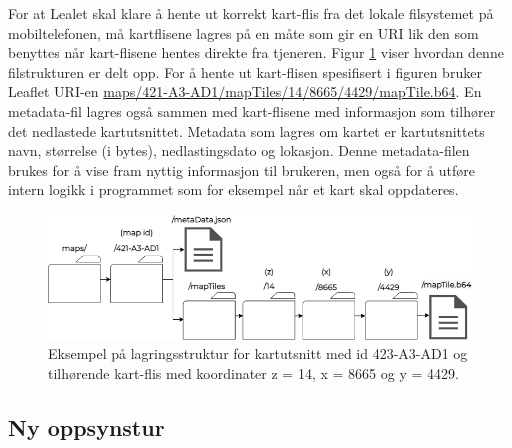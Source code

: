 \noindent
For at Lealet skal klare å hente ut korrekt kart-flis fra det lokale filsystemet på mobiltelefonen, må kartflisene lagres på en måte som gir en URI lik den som benyttes når kart-flisene hentes direkte fra tjeneren. Figur \ref{fig:kartutsnitt-lagring} viser hvordan denne filstrukturen er delt opp. For å hente ut kart-flisen spesifisert i figuren bruker Leaflet URI-en \url{maps/421-A3-AD1/mapTiles/14/8665/4429/mapTile.b64}. En metadata-fil lagres også sammen med kart-flisene med informasjon som tilhører det nedlastede kartutsnittet. Metadata som lagres om kartet er kartutsnittets navn, størrelse (i bytes), nedlastingsdato og lokasjon. Denne metadata-filen brukes for å vise fram nyttig informasjon til brukeren, men også for å utføre intern logikk i programmet som for eksempel når et kart skal oppdateres.  

\begin{figure}[H]
\centering
\captionsetup{width=.8\linewidth}
\includegraphics[scale=0.5]{Figurer/diagram/kartutsnitt-lagring.png}
\caption{Eksempel på lagringsstruktur for kartutsnitt med id 423-A3-AD1 og tilhørende kart-flis med koordinater z = 14, x = 8665 og y = 4429.}
\label{fig:kartutsnitt-lagring}
\end{figure}

\subsection{Ny oppsynstur}
